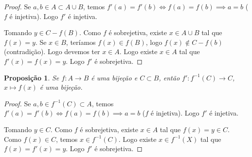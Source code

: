 \documentclass{article}
\newtheorem{prop}{Proposição}[section]
\theoremstyle{theorem}
\theoremstyle{lemma}
\theoremstyle{definition}
\theoremstyle{remark}
\begin{document}
\begin{proof}
	Se $a,b \in A\subset A\cup B$, temos $f'(a) = f'(b) \iff f(a) = f(b) \implies a = b$ ($f$ é injetiva). Logo $f'$ é injetiva.

	Tomando $y \in C-f(B)$. Como $f$ é sobrejetiva, existe $x\in A\cup B$ tal que $f(x) = y$. Se $x\in B$, teríamos $f(x) \in f(B)$, logo $f(x) \not \in C-f(b)$ (contradição). Logo devemos ter $x\in A$. Logo existe $x\in A$ tal que $f'(x) = f(x) = y$. Logo $f'$ é sobrejetiva. 
\end{proof}
\begin{prop}
	Se $f: A \to B$ é uma bijeção e $C \subset B$, então $f': f^{-1}(C) \to C$, $x\mapsto f(x)$ é uma bijeção.
\end{prop}
\begin{proof}
	Se $a,b \in f^{-1}(C) \subset A$, temos $f'(a) = f'(b) \iff f(a) = f(b) \implies a = b$ ($f$ é injetiva). Logo $f'$ é injetiva.

	Tomando $y \in C$. Como $f$ é sobrejetiva, existe $x\in A$ tal que $f(x) = y\in C$. Como $f(x)\in C$, temos $x \in f^{-1}(C)$. Logo existe $x\in f^{-1}(X)$ tal que $f(x) = f'(x) =  y$. Logo $f'$ é sobrejetiva.   
\end{proof}
\end{document}
